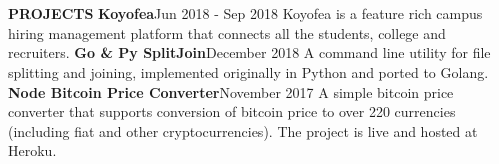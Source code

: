 \documentclass[a4paper, 12pt]{article}
\begin{document}
\section*{}
\begin{vwcol}[widths={0.2, 0.8}, justify=flush, sep=0.7cm, rule=0pt, indent=1em]
\large{\textbf{\textcolor{uclagold}{PROJECTS}}}\newline\newline\newline\newline\newline\newline\newline\newline\newline\newline\newline\newline\newline\newline\newline\newline
\large{\textbf{Koyofea}}\hspace{10.3cm}\tiny{Jun 2018 - Sep 2018}\vspace{-0.05cm}\newline
\small{Koyofea is a feature rich campus hiring management platform that connects all the students, college and recruiters.}\vspace{0.3cm}\newline
\large{\textbf{Go \& Py SplitJoin}}\hspace{8.2cm}\tiny{December 2018}\vspace{-0.05cm}\newline
\small{A command line utility for file splitting and joining, implemented originally in Python and ported to Golang.}\vspace{0.3cm}\newline
\large{\textbf{Node Bitcoin Price Converter}}\hspace{5.4cm}\tiny{November 2017}\vspace{-0.05cm}\newline
\small{A simple bitcoin price converter that supports conversion of bitcoin price to over 220 currencies (including fiat and other cryptocurrencies). The project is live and hosted at Heroku.}\vspace{0.3cm}\newline
\end{vwcol}

\vspace{-3.3cm}
\end{document}
